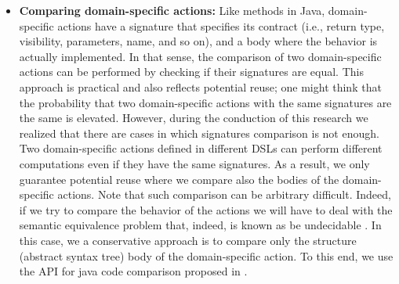 \begin{itemize}
\vspace{2mm}

\item \textbf{Comparing domain-specific actions:} Like methods in Java, domain-specific actions have a signature that specifies its contract (i.e., return type, visibility, parameters, name, and so on), and a body where the behavior is actually implemented. In that sense, the comparison of two domain-specific actions can be performed by checking if their signatures are equal. This approach is practical and also reflects potential reuse; one might think that the probability that two domain-specific actions with the same signatures are the same is elevated. However, during the conduction of this research we realized that there are cases in which signatures comparison is not enough. Two domain-specific actions defined in different DSLs can perform different computations even if they have the same signatures. As a result, we only guarantee potential reuse where we compare also the bodies of the domain-specific actions. Note that such comparison can be arbitrary difficult. Indeed, if we try to compare  the behavior of the actions we will have to deal with the semantic equivalence problem that, indeed, is known as be undecidable \cite{Lucanu:2013}. In this case, we a conservative approach is to compare only the structure (abstract syntax tree) body of the domain-specific action. To this end, we use the API for java code comparison proposed in \cite{Biegel:2010}.



\end{itemize}
